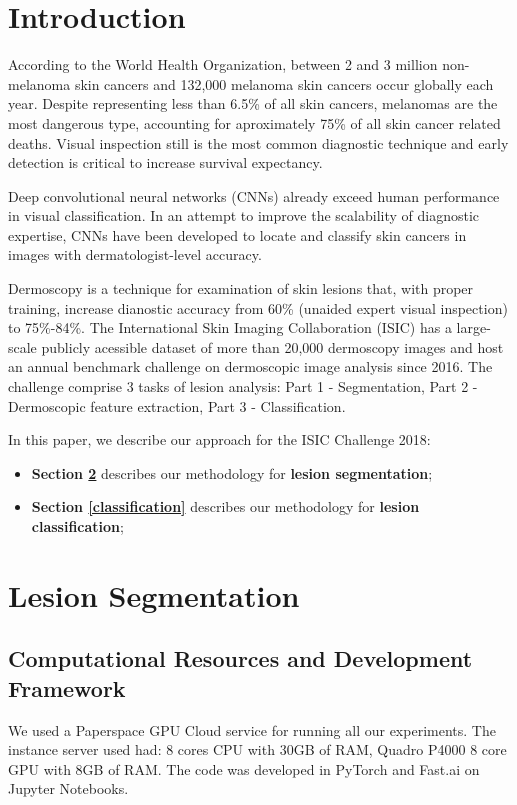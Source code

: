 \documentclass[conference]{IEEEtran}
\begin{document}
\section{Introduction}

According to the World Health Organization, between 2 and 3 million non-melanoma skin cancers and 132,000 melanoma skin cancers occur globally each year\cite{who}. Despite representing less than 6.5\% of all skin cancers, melanomas are the most dangerous type, accounting for aproximately 75\% of all skin cancer related deaths\cite{who, nature}.  Visual inspection still is the most common diagnostic technique and early detection is critical to increase survival expectancy.

Deep convolutional neural networks (CNNs) already exceed human performance in visual classification\cite{fei}.  In an attempt to improve the scalability of diagnostic expertise, CNNs have been developed to locate and classify skin cancers in images with dermatologist-level accuracy\cite{nature}.

Dermoscopy is a technique for examination of skin lesions that, with proper training, increase dianostic accuracy from 60\% (unaided expert visual inspection) to 75\%-84\%\cite{isic}. The International Skin Imaging Collaboration (ISIC) has a large-scale publicly acessible dataset of more than 20,000 dermoscopy images and host an annual benchmark challenge on dermoscopic image analysis since 2016.  The challenge comprise 3 tasks of lesion analysis: Part 1 - Segmentation, Part 2 - Dermoscopic feature extraction, Part 3 - Classification. 

In this paper, we describe our approach for the ISIC Challenge 2018:
\begin{itemize}
\item \textbf{Section \ref{segmentation}} describes our methodology for \textbf{lesion segmentation};
\item \textbf{Section \ref{classification}} describes our methodology for \textbf{lesion classification};
\end{itemize}


\section{Lesion Segmentation}
\label{segmentation}
\subsection{Computational Resources and Development Framework\label{resources}}
We used a Paperspace GPU Cloud service for running all our experiments. The instance server used had: 8 cores CPU with 30GB of RAM, Quadro P4000 8 core GPU with 8GB of RAM. 
The code was developed in PyTorch and Fast.ai\cite{fastai} on Jupyter Notebooks.
\end{document}
